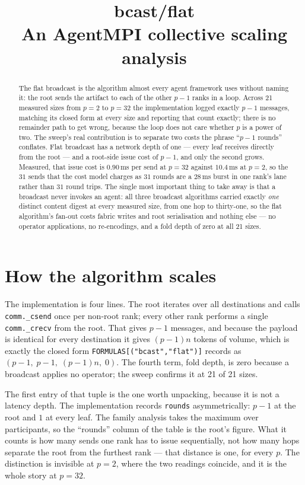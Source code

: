 \documentclass[11pt]{article}
\title{\textbf{bcast/flat}\\[2pt]\large An AgentMPI collective scaling analysis}
\author{}
\date{}
\begin{document}
\maketitle

\begin{abstract}
The flat broadcast is the algorithm almost every agent framework uses without naming it:
the root sends the artifact to each of the other $p-1$ ranks in a loop. Across 21 measured
sizes from $p=2$ to $p=32$ the implementation logged exactly $p-1$ messages, matching its
closed form at every size and reporting that count exactly; there is no remainder path to
get wrong, because the loop does not care whether $p$ is a power of two. The sweep's real
contribution is to separate two costs the phrase ``$p-1$ rounds'' conflates. Flat broadcast
has a network depth of one --- every leaf receives directly from the root --- and a
root-side issue cost of $p-1$, and only the second grows. Measured, that issue cost is
$0.90$\,ms per send at $p=32$ against $10.4$\,ms at $p=2$, so the $31$ sends that the cost
model charges as $31$ rounds are a $28$\,ms burst in one rank's lane rather than $31$
round trips. The single most important thing to take away is that a broadcast never invokes
an agent: all three broadcast algorithms carried exactly \emph{one} distinct content digest
at every measured size, from one hop to thirty-one, so the flat algorithm's fan-out costs
fabric writes and root serialisation and nothing else --- no operator applications, no
re-encodings, and a fold depth of zero at all 21 sizes.
\end{abstract}



\section{How the algorithm scales}

The implementation is four lines. The root iterates over all destinations and calls
\texttt{comm.\_csend} once per non-root rank; every other rank performs a single
\texttt{comm.\_crecv} from the root. That gives $p-1$ messages, and because the payload is
identical for every destination it gives $(p-1)n$ tokens of volume, which is exactly the
closed form \texttt{FORMULAS[("bcast","flat")]} records as $(p-1,\;p-1,\;(p-1)n,\;0)$. The
fourth term, fold depth, is zero because a broadcast applies no operator; the sweep confirms
it at 21 of 21 sizes.

The first entry of that tuple is the one worth unpacking, because it is not a latency depth.
The implementation records \texttt{rounds} asymmetrically: $p-1$ at the root and $1$ at every
leaf. The family analysis takes the maximum over participants, so the ``rounds'' column of
the table is the root's figure. What it counts is how many sends one rank has to issue
sequentially, not how many hops separate the root from the furthest rank --- that distance is
one, for every $p$. The distinction is invisible at $p=2$, where the two readings coincide,
and it is the whole story at $p=32$.
\end{document}
